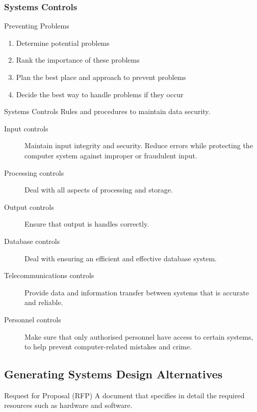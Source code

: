 \documentclass[\main/notes.tex]{subfiles}
\begin{document}
				\subsubsection{Systems Controls}
					\begin{sidenote}{Preventing Problems}
							\begin{enumerate}[nosep]
								\item Determine potential problems
								\item Rank the importance of these problems
								\item Plan the best place and approach to prevent problems
								\item Decide the best way to handle problems if they occur
							\end{enumerate}
					\end{sidenote}
					\begin{sidenote}{Systems Controls}
						Rules and procedures to maintain data security.
						\begin{indentparagraph}
							\begin{description}
								\item[Input controls] Maintain input integrity and security. Reduce errors while protecting the computer system against improper or fraudulent input.
								\item[Processing controls] Deal with all aspects of processing and storage.
								\item[Output controls] Ensure that output is handles correctly.
								\item[Database controls] Deal with ensuring an efficient and effective database system.
								\item[Telecommunications controls] Provide data and information transfer between systems that is accurate and reliable.
								\item[Personnel controls] Make sure that only authorised personnel have access to certain systems, to help prevent computer-related mistakes and crime.
							\end{description}
						\end{indentparagraph}
					\end{sidenote}
			\subsection{Generating Systems Design Alternatives}
				\begin{definition}{Request for Proposal (RFP)}
					A document that specifies in detail the required resources such as hardware and software.
				\end{definition}
\end{document}
